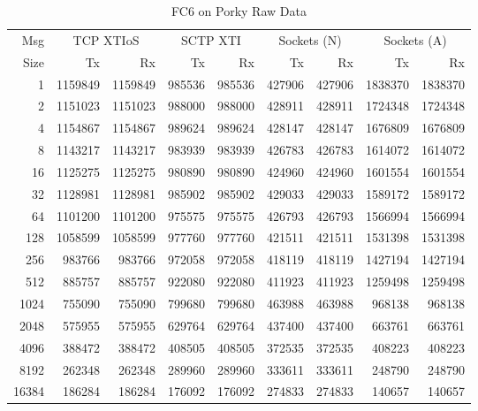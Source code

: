 \documentclass[letterpaper,final,notitlepage,twocolumn,10pt,twoside]{article}
\let\normalsize = \small
\let\small = \footnotesize
\let\footnotesize = \scriptsize
\let\scriptsize = \tiny
\begin{document}
\begin{appendix}
\begin{table}[hbp]
\footnotesize
\begin{center}
\setlength{\tabcolsep}{0.2em}
\setlength{\arraycolsep}{0.2em}
\begin{tabular}{rrrrrrrrr}\\
Msg & \multicolumn{2}{c}{TCP XTIoS} & \multicolumn{2}{c}{SCTP XTI} & \multicolumn{2}{c}{Sockets (N)} & \multicolumn{2}{c}{Sockets (A)}\\
Size & Tx & Rx & Tx & Rx & Tx & Rx & Tx & Rx\\
\hline
\hline
1 & 1159849 & 1159849 & 985536 & 985536 & 427906 & 427906 & 1838370 & 1838370\\
2 & 1151023 & 1151023 & 988000 & 988000 & 428911 & 428911 & 1724348 & 1724348\\
4 & 1154867 & 1154867 & 989624 & 989624 & 428147 & 428147 & 1676809 & 1676809\\
8 & 1143217 & 1143217 & 983939 & 983939 & 426783 & 426783 & 1614072 & 1614072\\
16 & 1125275 & 1125275 & 980890 & 980890 & 424960 & 424960 & 1601554 & 1601554\\
32 & 1128981 & 1128981 & 985902 & 985902 & 429033 & 429033 & 1589172 & 1589172\\
64 & 1101200 & 1101200 & 975575 & 975575 & 426793 & 426793 & 1566994 & 1566994\\
128 & 1058599 & 1058599 & 977760 & 977760 & 421511 & 421511 & 1531398 & 1531398\\
256 & 983766 & 983766 & 972058 & 972058 & 418119 & 418119 & 1427194 & 1427194\\
512 & 885757 & 885757 & 922080 & 922080 & 411923 & 411923 & 1259498 & 1259498\\
1024 & 755090 & 755090 & 799680 & 799680 & 463988 & 463988 & 968138 & 968138\\
2048 & 575955 & 575955 & 629764 & 629764 & 437400 & 437400 & 663761 & 663761\\
4096 & 388472 & 388472 & 408505 & 408505 & 372535 & 372535 & 408223 & 408223\\
8192 & 262348 & 262348 & 289960 & 289960 & 333611 & 333611 & 248790 & 248790\\
16384 & 186284 & 186284 & 176092 & 176092 & 274833 & 274833 & 140657 & 140657\\
\hline
\end{tabular}
\end{center}
\normalsize
\caption[FC6 on Porky Raw Data]{FC6 on Porky Raw Data}
\label{table:fc6data}
\end{table}


\end{appendix}
\end{document}
